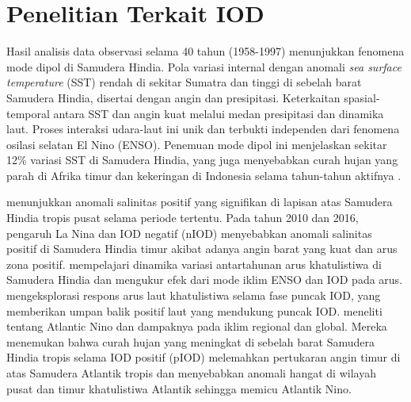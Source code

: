 \vspace{1.5pc}
\vspace{-1pc}
\section[Penelitian Terkait IOD]{Penelitian Terkait IOD}
\begin{spacing}{1.5}
	Hasil analisis data observasi selama 40 tahun (1958-1997) menunjukkan fenomena mode dipol di Samudera Hindia. Pola variasi internal dengan anomali \textit{sea surface temperature} (SST) rendah di sekitar Sumatra dan tinggi di sebelah barat Samudera Hindia, disertai dengan angin dan presipitasi. Keterkaitan spasial-temporal antara SST dan angin kuat melalui medan presipitasi dan dinamika laut. Proses interaksi udara-laut ini unik dan terbukti independen dari fenomena osilasi selatan El Nino (ENSO). Penemuan mode dipol ini menjelaskan sekitar 12\% variasi SST di Samudera Hindia, yang juga menyebabkan curah hujan yang parah di Afrika timur dan kekeringan di Indonesia selama tahun-tahun aktifnya \cite{Saji1999}.
	
	 menunjukkan anomali salinitas positif yang signifikan di lapisan atas Samudera Hindia tropis pusat selama periode tertentu. Pada tahun 2010 dan 2016, pengaruh La Nina dan IOD negatif (nIOD) menyebabkan anomali salinitas positif di Samudera Hindia timur akibat adanya angin barat yang kuat dan arus zona positif.  mempelajari dinamika variasi antartahunan arus khatulistiwa di Samudera Hindia dan mengukur efek dari mode iklim ENSO dan IOD pada arus.  mengeksplorasi respons arus laut khatulistiwa selama fase puncak IOD, yang memberikan umpan balik positif laut yang mendukung puncak IOD.  meneliti tentang Atlantic Nino dan dampaknya pada iklim regional dan global. Mereka menemukan bahwa curah hujan yang meningkat di sebelah barat Samudera Hindia tropis selama IOD positif (pIOD) melemahkan pertukaran angin timur di atas Samudera Atlantik tropis dan menyebabkan anomali hangat di wilayah pusat dan timur khatulistiwa Atlantik sehingga memicu Atlantik Nino.
	

\end{spacing}
